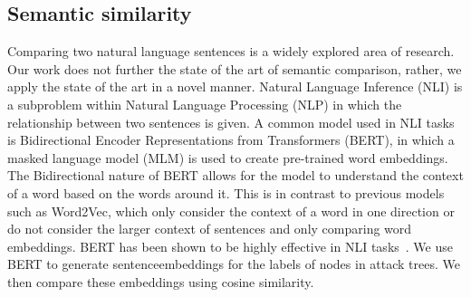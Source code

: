 



\subsection{Semantic similarity}
\label{ssec:semantic-similarity}


Comparing two natural language sentences is a widely explored area of research. Our work does not further the state of the art of semantic comparison, rather, we apply the state of the art in a novel manner. Natural Language Inference (NLI) is a subproblem within Natural Language Processing (NLP) in which the relationship between two sentences is given. A common model used in NLI tasks is Bidirectional Encoder Representations from Transformers (BERT), in which a masked language model (MLM) is used to create pre-trained word embeddings. The Bidirectional nature of BERT allows for the model to understand the context of a word based on the words around it. This is in contrast to previous models such as Word2Vec, which only consider the context of a word in one direction or do not consider the larger context of sentences and only comparing word embeddings. BERT has been shown to be highly effective in NLI tasks~\cite{devlin_bert_2019}. We use BERT to generate sentenceembeddings for the labels of nodes in attack trees. We then compare these embeddings using cosine similarity. 








